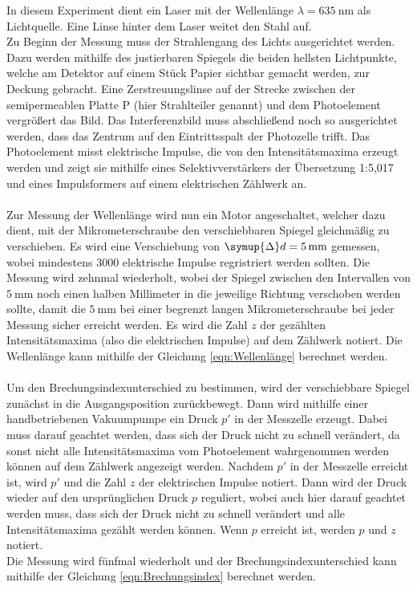     In diesem Experiment dient ein Laser mit der Wellenlänge $\lambda = \SI{635}{\nano\meter}$ als Lichtquelle.
    Eine Linse hinter dem Laser weitet den Stahl auf.\\
    Zu Beginn der Messung muss der Strahlengang des Lichts ausgerichtet werden.
    Dazu werden mithilfe des justierbaren Spiegels die beiden hellsten Lichtpunkte,
    welche am Detektor auf einem Stück Papier sichtbar gemacht werden,
    zur Deckung gebracht.
    Eine Zerstreuungslinse auf der Strecke zwischen der semipermeablen Platte P (hier Strahlteiler genannt) und dem Photoelement vergrößert das Bild.
    Das Interferenzbild muss abschließend noch so ausgerichtet werden,
    dass das Zentrum auf den Eintrittsspalt der Photozelle trifft.
    Das Photoelement misst elektrische Impulse,
    die von den Intensitätsmaxima erzeugt werden und zeigt sie mithilfe eines Selektivverstärkers der Übersetzung 1:5,017 
    und eines Impulsformers auf einem elektrischen Zählwerk an.\\
    \\
    Zur Messung der Wellenlänge wird nun ein Motor angeschaltet,
    welcher dazu dient,
    mit der Mikrometerschraube den verschiebbaren Spiegel gleichmäßig zu verschieben.
    Es wird eine Verschiebung von $\symup{\Delta}d = \SI{5}{\milli\meter}$ gemessen,
    wobei mindestens 3000 elektrische Impulse regristriert werden sollten.
    Die Messung wird zehnmal wiederholt,
    wobei der Spiegel zwischen den Intervallen von $\SI{5}{\milli\meter}$ noch einen halben Millimeter in die jeweilige Richtung verschoben werden sollte, 
    damit die $\SI{5}{\milli\meter}$ bei einer begrenzt langen Mikrometerschraube bei jeder Messung sicher erreicht werden.
    Es wird die Zahl $z$ der gezählten Intensitätsmaxima (also die elektrischen Impulse) auf dem Zählwerk notiert.
    Die Wellenlänge kann mithilfe der Gleichung \eqref{eqn:Wellenlänge} berechnet werden.\\
    \\
    Um den Brechungsindexunterschied zu bestimmen,
    wird der verschiebbare Spiegel zunächst in die Ausgangsposition zurückbewegt.
    Dann wird mithilfe einer handbetriebenen Vakuumpumpe ein Druck $p'$ in der Messzelle erzeugt.
    Dabei muss darauf geachtet werden,
    dass sich der Druck nicht zu schnell verändert,
    da sonst nicht alle Intensitätsmaxima vom Photoelement wahrgenommen werden können auf dem Zählwerk angezeigt werden.
    Nachdem $p'$ in der Messzelle erreicht ist,
    wird $p'$ und die Zahl $z$ der elektrischen Impulse notiert.
    Dann wird der Druck wieder auf den ursprünglichen Druck $p$ reguliert,
    wobei auch hier darauf geachtet werden muss,
    dass sich der Druck nicht zu schnell verändert und alle Intensitätsmaxima gezählt werden können.
    Wenn $p$ erreicht ist,
    werden $p$ und $z$ notiert.\\
    Die Messung wird fünfmal wiederholt und der Brechungsindexunterschied kann mithilfe der Gleichung \eqref{eqn:Brechungsindex} berechnet werden.
